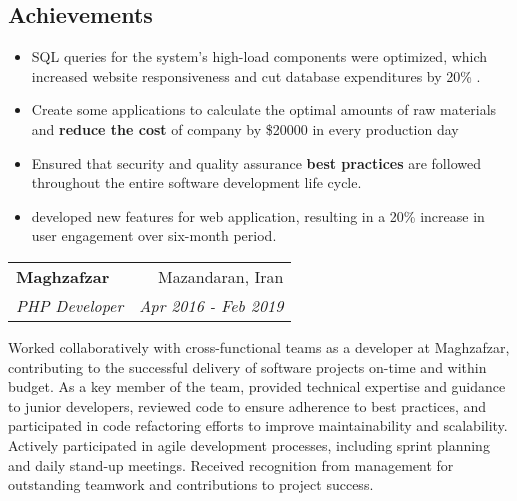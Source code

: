 \documentclass[A4,11pt]{article}
\makeatletter
\newcommand{\resumeItem}[2]{
  \item{
    \textbf{#1}{: #2 \vspace{-2pt}}
  }
}
\newcommand{\resumeProjectItem}[1]{
  \item{
    { #1 \vspace{-2pt}}
  }
}
\newcommand{\resumeSubheading}[4]{
  \vspace{-1pt}\item
    \begin{tabular*}{0.97\textwidth}[t]{l@{\extracolsep{\fill}}r}
      \textbf{#1} & #2 \\
      \textit{#3} & \textit{\small #4} \\
    \end{tabular*}\vspace{-5pt}
}
\newcommand{\resumeSubSubheading}[2]{
    \begin{tabular*}{0.97\textwidth}{l@{\extracolsep{\fill}}r}
      \textit{#1} & \textit{\small #2} \\
    \end{tabular*}\vspace{-5pt}
}
\newcommand{\resumeSubHeadingListEnd}{\end{itemize}}
\newcommand{\resumeItemListStart}{\begin{itemize}}
\newcommand{\resumeItemListEnd}{\end{itemize}\vspace{-5pt}}
\makeatother
\begin{document}
	\subsection*{Achievements}
	\vspace{-10pt}
	\resumeItemListStart
	\resumeProjectItem{ SQL queries for the system's high-load components were optimized, which increased website responsiveness and cut database expenditures by 20\%  .   }
	 \resumeProjectItem{Create some applications to calculate the optimal amounts of raw materials and \textbf{reduce the cost} of company by \$20000 in every production day}
        \resumeProjectItem{Ensured that security and quality assurance \textbf{best practices} are followed throughout the entire software development life cycle. }
     \resumeProjectItem{developed new features for web application, resulting in a 20\% increase in user engagement over six-month period.}

	
      \resumeItemListEnd
      
    

\newpage
 
    \resumeSubheading
      {Maghzafzar}{Mazandaran, Iran}
      {PHP Developer}{Apr 2016 - Feb 2019}
      
     \vspace{10pt}

	{ 
	Worked collaboratively with cross-functional teams as a developer at Maghzafzar, contributing to the successful delivery of software projects on-time and within budget. As a key member of the team, provided technical expertise and guidance to junior developers, reviewed code to ensure adherence to best practices, and participated in code refactoring efforts to improve maintainability and scalability. Actively participated in agile development processes, including sprint planning and daily stand-up meetings. Received recognition from management for outstanding teamwork and contributions to project success.
       }

      
\end{document}
